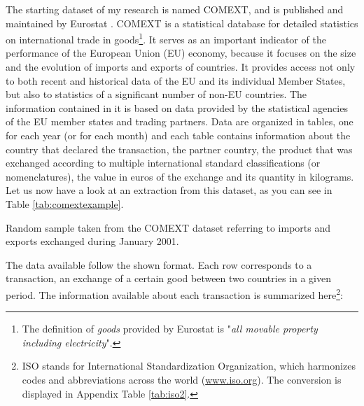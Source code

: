 The starting dataset of my research is named COMEXT, and is published and maintained by Eurostat \cite{eurostat2022comext}. COMEXT is a statistical database for detailed statistics on international trade in goods\footnote{The definition of \textit{goods} provided by Eurostat is "\textit{all movable property including electricity}".}. It serves as an important indicator of the performance of the European Union (EU) economy, because it focuses on the size and the evolution of imports and exports of countries. It provides access not only to both recent and historical data of the EU and its individual Member States, but also to statistics of a significant number of non-EU countries. The information contained in it is based on data provided by the statistical agencies of the EU member states and trading partners.
Data are organized in tables, one for each year (or for each month) and each table contains information about the country that declared the transaction, the partner country, the product that was exchanged according to multiple international standard classifications (or nomenclatures), the value in euros of the exchange and its quantity in kilograms.
Let us now have a look at an extraction from this dataset, as you can see in Table \ref{tab:comextexample}.
\begin{landscape}
\begin{table}
    \centering
    
    \caption{Random sample taken from the COMEXT dataset referring to imports and exports exchanged during January 2001.}
    \label{tab:comextexample}
\end{table}
\end{landscape}
The data available follow the shown format. Each row corresponds to a transaction, an exchange of a certain good between two countries in a given period. The information available about each transaction is summarized here\footnote{ISO stands for International Standardization Organization, which harmonizes codes and abbreviations across the world (\url{www.iso.org}). The conversion is displayed in Appendix Table \ref{tab:iso2}.}:
